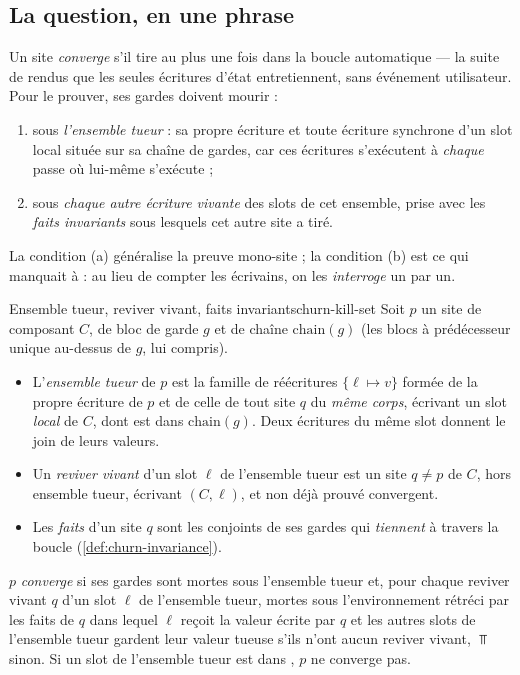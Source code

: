 \subsection{La question, en une phrase}

Un site \emph{converge} s'il tire au plus une fois dans la boucle automatique --- la suite
de rendus que les seules écritures d'état entretiennent, sans événement utilisateur. Pour
le prouver, ses gardes doivent mourir :
\begin{enumerate}
  \item[(a)] sous \emph{l'ensemble tueur} : sa propre écriture et toute écriture synchrone
        d'un slot local située sur sa chaîne de gardes, car ces écritures s'exécutent à
        \emph{chaque} passe où lui-même s'exécute ;
  \item[(b)] sous \emph{chaque autre écriture vivante} des slots de cet ensemble, prise avec
        les \emph{faits invariants} sous lesquels cet autre site a tiré.
\end{enumerate}
La condition (a) généralise la preuve mono-site ; la condition (b) est ce qui manquait à
 : au lieu de compter les écrivains, on les \emph{interroge} un par un.

\begin{definition}{Ensemble tueur, reviver vivant, faits invariants}{churn-kill-set}
Soit $p$ un site de composant $C$, de bloc de garde $g$ et de chaîne
$\mathrm{chain}(g)$ (les blocs à prédécesseur unique au-dessus de $g$, lui compris).
\begin{itemize}
  \item L'\emph{ensemble tueur} de $p$ est la famille de réécritures
        $\{\ell \mapsto v\}$ formée de la propre écriture de $p$ et de celle de tout site $q$
        du \emph{même corps}, écrivant un slot \emph{local} de $C$, dont  est dans
        $\mathrm{chain}(g)$. Deux écritures du même slot donnent le join de leurs valeurs.
  \item Un \emph{reviver vivant} d'un slot $\ell$ de l'ensemble tueur est un site $q \neq p$
        de $C$, hors ensemble tueur, écrivant $(C, \ell)$, et non déjà prouvé convergent.
  \item Les \emph{faits} d'un site $q$ sont les conjoints de ses gardes qui
        \emph{tiennent} à travers la boucle (\cref{def:churn-invariance}).
\end{itemize}
$p$ \emph{converge} si ses gardes sont mortes sous l'ensemble tueur et, pour chaque reviver
vivant $q$ d'un slot $\ell$ de l'ensemble tueur, mortes sous l'environnement rétréci par
les faits de $q$ dans lequel $\ell$ reçoit la valeur écrite par $q$ et les autres slots de
l'ensemble tueur gardent leur valeur tueuse s'ils n'ont aucun reviver vivant, $\Top$ sinon.
Si un slot de l'ensemble tueur est dans , $p$ ne converge pas.
\end{definition}

